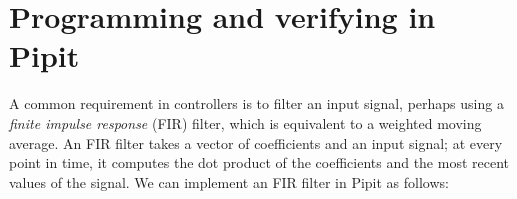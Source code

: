 \documentclass[sigplan,screen, review]{acmart}
\begin{document}



\section{Programming and verifying in Pipit}
\label{s:tut}

A common requirement in controllers is to filter an input signal, perhaps using a \emph{finite impulse response} (FIR) filter, which is equivalent to a weighted moving average.
An FIR filter takes a vector of coefficients and an input signal; at every point in time, it computes the dot product of the coefficients and the most recent values of the signal.
We can implement an FIR filter in Pipit as follows:
\end{document}

